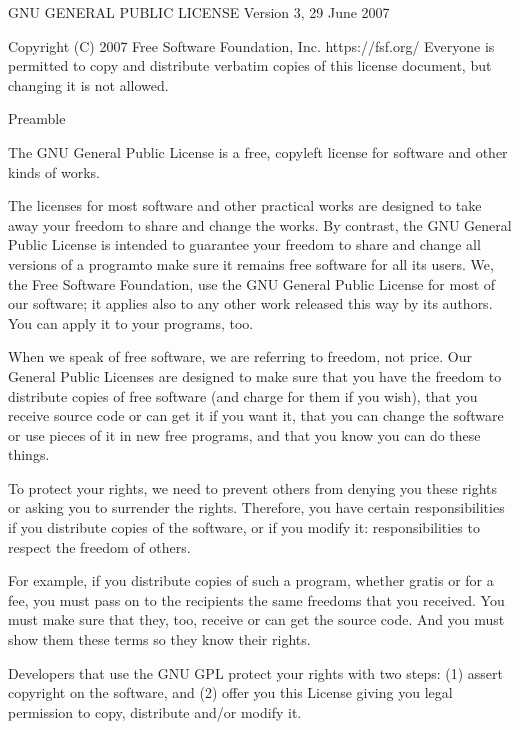 \documentclass[letterpaper,10pt,english]{sphinxmanual}
\begin{document}
\begin{sphinxVerbatim}[commandchars=\\\{\}]
                    GNU GENERAL PUBLIC LICENSE
                       Version 3, 29 June 2007

 Copyright (C) 2007 Free Software Foundation, Inc. \PYGZlt{}https://fsf.org/\PYGZgt{}
 Everyone is permitted to copy and distribute verbatim copies
 of this license document, but changing it is not allowed.

                            Preamble

  The GNU General Public License is a free, copyleft license for
software and other kinds of works.

  The licenses for most software and other practical works are designed
to take away your freedom to share and change the works.  By contrast,
the GNU General Public License is intended to guarantee your freedom to
share and change all versions of a program\PYGZhy{}\PYGZhy{}to make sure it remains free
software for all its users.  We, the Free Software Foundation, use the
GNU General Public License for most of our software; it applies also to
any other work released this way by its authors.  You can apply it to
your programs, too.

  When we speak of free software, we are referring to freedom, not
price.  Our General Public Licenses are designed to make sure that you
have the freedom to distribute copies of free software (and charge for
them if you wish), that you receive source code or can get it if you
want it, that you can change the software or use pieces of it in new
free programs, and that you know you can do these things.

  To protect your rights, we need to prevent others from denying you
these rights or asking you to surrender the rights.  Therefore, you have
certain responsibilities if you distribute copies of the software, or if
you modify it: responsibilities to respect the freedom of others.

  For example, if you distribute copies of such a program, whether
gratis or for a fee, you must pass on to the recipients the same
freedoms that you received.  You must make sure that they, too, receive
or can get the source code.  And you must show them these terms so they
know their rights.

  Developers that use the GNU GPL protect your rights with two steps:
(1) assert copyright on the software, and (2) offer you this License
giving you legal permission to copy, distribute and/or modify it.


\end{sphinxVerbatim}
\end{document}
